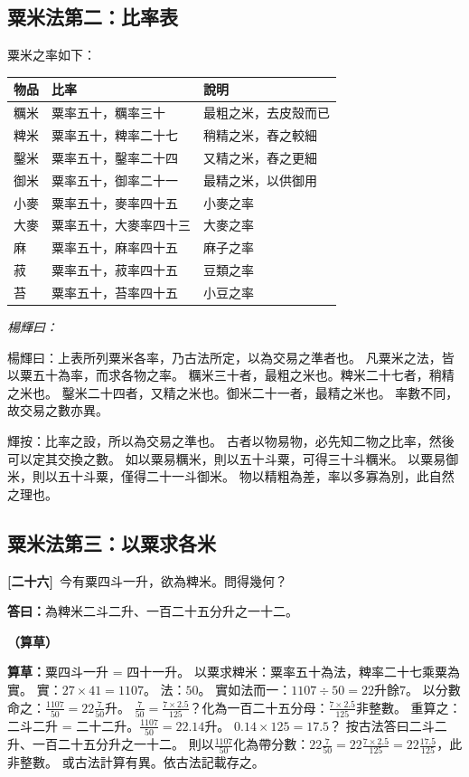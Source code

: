 \documentclass[11pt,a4paper]{article}
\newenvironment{caocao}{%
  \par\noindent\textcolor{caocaocolor}{\small\textbf{（算草）}}%
  \ignorespaces
}{\par\vspace{0.5em}}
\newenvironment{yanghuicomment}{%
  \par\noindent\textcolor{commentarycolor}{\small\textit{楊輝曰：}}%
  \ignorespaces
}{\par\vspace{0.5em}}
\newcommand{\problemnum}[1]{\textbf{[\ignorespaces#1\unskip]}}
\begin{document}
\subsection{粟米法第二：比率表}

粟米之率如下：

\begin{center}
\begin{tabular}{lll}
\toprule
\textbf{物品} & \textbf{比率} & \textbf{說明} \\
\midrule
糲米 & 粟率五十，糲率三十 & 最粗之米，去皮殼而已 \\
粺米 & 粟率五十，粺率二十七 & 稍精之米，舂之較細 \\
鑿米 & 粟率五十，鑿率二十四 & 又精之米，舂之更細 \\
御米 & 粟率五十，御率二十一 & 最精之米，以供御用 \\
小麥 & 粟率五十，麥率四十五 & 小麥之率 \\
大麥 & 粟率五十，大麥率四十三 & 大麥之率 \\
麻 & 粟率五十，麻率四十五 & 麻子之率 \\
菽 & 粟率五十，菽率四十五 & 豆類之率 \\
苔 & 粟率五十，苔率四十五 & 小豆之率 \\
\bottomrule
\end{tabular}
\end{center}

\begin{yanghuicomment}
楊輝曰：上表所列粟米各率，乃古法所定，以為交易之準者也。
凡粟米之法，皆以粟五十為率，而求各物之率。
糲米三十者，最粗之米也。粺米二十七者，稍精之米也。
鑿米二十四者，又精之米也。御米二十一者，最精之米也。
率數不同，故交易之數亦異。

輝按：比率之設，所以為交易之準也。
古者以物易物，必先知二物之比率，然後可以定其交換之數。
如以粟易糲米，則以五十斗粟，可得三十斗糲米。
以粟易御米，則以五十斗粟，僅得二十一斗御米。
物以精粗為差，率以多寡為別，此自然之理也。
\end{yanghuicomment}

\subsection{粟米法第三：以粟求各米}

\noindent\problemnum{二十六}\,
今有粟四斗一升，欲為粺米。問得幾何？

\noindent\textcolor{answercolor}{\textbf{答曰：}}為粺米二斗二升、一百二十五分升之一十二。

\begin{caocao}
\textbf{算草：}粟四斗一升 = 四十一升。
以粟求粺米：粟率五十為法，粺率二十七乘粟為實。
實：$27 \times 41 = 1107$。
法：$50$。
實如法而一：$1107 \div 50 = 22$升餘$7$。
以分數命之：$\frac{1107}{50} = 22\frac{7}{50}$升。
$\frac{7}{50} = \frac{7 \times 2.5}{125}$？化為一百二十五分母：$\frac{7 \times 2.5}{125}$非整數。
重算之：二斗二升 = 二十二升。$\frac{1107}{50} = 22.14$升。
$0.14 \times 125 = 17.5$？
按古法答曰二斗二升、一百二十五分升之一十二。
則以$\frac{1107}{50}$化為帶分數：$22\frac{7}{50} = 22\frac{7 \times 2.5}{125} = 22\frac{17.5}{125}$，此非整數。
或古法計算有異。依古法記載存之。
\end{caocao}
\end{document}
